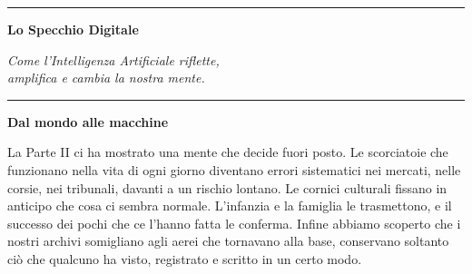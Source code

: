 

\cleardoublepage
\thispagestyle{empty}

\vspace*{\fill}

\begin{center}
    {\sffamily\huge{}}
    
    \vspace{1.5em}
    
    \rule{0.5\textwidth}{0.4pt}
    
    \vspace{1.5em}
    
    {\sffamily\Huge\bfseries Lo Specchio Digitale}
    
    \vspace{2em}
    
    \begin{minipage}{0.7\textwidth}
        \centering
        {\large\itshape\color{moderngray}
        Come l'Intelligenza Artificiale riflette,\\
        amplifica e cambia la nostra mente.}
    \end{minipage}
    
    \vspace{1.5em}
    
    \rule{0.5\textwidth}{0.4pt}
\end{center}

\vspace*{\fill}

\clearpage
\thispagestyle{empty}
\vspace*{2em}
\begin{center}
	{\sffamily\large\bfseries\color{darkgray} Dal mondo alle macchine}
\end{center}
\vspace{1em}

La Parte II ci ha mostrato una mente che decide fuori posto. Le scorciatoie che funzionano nella vita di ogni giorno diventano errori sistematici nei mercati, nelle corsie, nei tribunali, davanti a un rischio lontano. Le cornici culturali fissano in anticipo che cosa ci sembra normale. L'infanzia e la famiglia le trasmettono, e il successo dei pochi che ce l'hanno fatta le conferma. Infine abbiamo scoperto che i nostri archivi somigliano agli aerei che tornavano alla base, conservano soltanto ciò che qualcuno ha visto, registrato e scritto in un certo modo.

